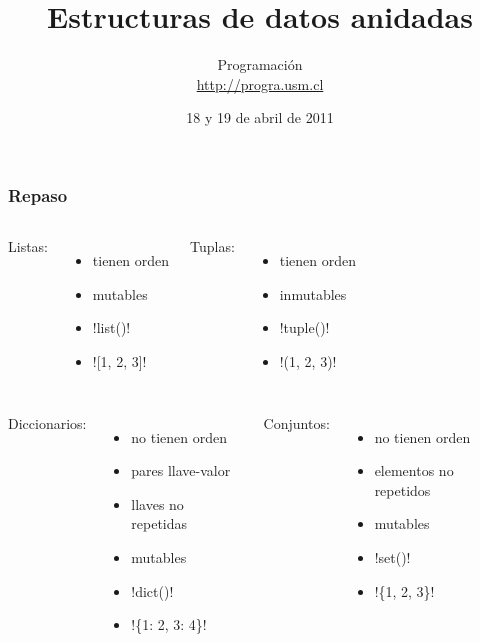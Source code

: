 \documentclass[12pt]{beamer}
\title{Estructuras de datos anidadas}
\author{
  Programación \\ \url{http://progra.usm.cl}
}
\date{18 y 19 de abril de 2011}
\begin{document}
  \begin{frame}
    \maketitle
  \end{frame}

  \begin{frame}
    \label{repaso}
    \frametitle{Repaso}
    \small
    \def\sep{-1ex}
    \begin{columns}[T]
        Listas:
        \begin{itemize}
          \setlength{\itemsep}{\sep}
          \item tienen orden
          \item mutables
          \item \li!list()!
          \item \li![1, 2, 3]!
        \end{itemize}
        Tuplas:
        \begin{itemize}
          \setlength{\itemsep}{\sep}
          \item tienen orden
          \item inmutables
          \item \li!tuple()!
          \item \li!(1, 2, 3)!
        \end{itemize}
    \end{columns}
    \vfill
    \begin{columns}[T]
        Diccionarios:
        \begin{itemize}
          \setlength{\itemsep}{\sep}
          \item no tienen orden
          \item pares llave-valor
          \item llaves no repetidas
          \item mutables
          \item \li!dict()!
          \item \li!\{1: 2, 3: 4\}!
        \end{itemize}
        Conjuntos:
        \begin{itemize}
          \setlength{\itemsep}{\sep}
          \item no tienen orden
          \item elementos no repetidos
          \item mutables
          \item \li!set()!
          \item \li!\{1, 2, 3\}!
        \end{itemize}
    \end{columns}
  \end{frame}
\end{document}
